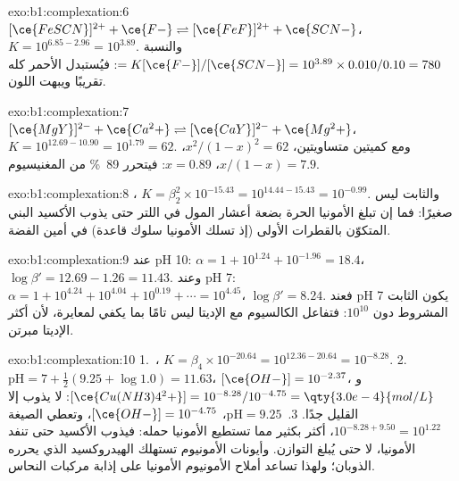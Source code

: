\begin{solution}{exo:b1:complexation:6}
$[\ce{FeSCN}]^{2+} + \ce{F-} \rightleftharpoons [\ce{FeF}]^{2+} + \ce{SCN-}$،
$K = 10^{6.85 - 2.96} = 10^{3.89}$. والنسبة $= K[\ce{F-}]/[\ce{SCN-}] =
10^{3.89} \times 0.010/0.10 = 780$: فيُستبدل  الأحمر كله تقريبًا
ويبهت اللون.
\end{solution}

\begin{solution}{exo:b1:complexation:7}
$[\ce{MgY}]^{2-} + \ce{Ca^2+} \rightleftharpoons [\ce{CaY}]^{2-} + \ce{Mg^2+}$،
$K = 10^{12.69 - 10.90} = 10^{1.79} = 62$. ومع كميتين متساويتين،
$x^2/(1 - x)^2 = 62$، $x/(1 - x) = 7.9$، $x = 0.89$: فيتحرر \qty{89}{\percent} من
المغنيسيوم.
\end{solution}

\begin{solution}{exo:b1:complexation:8}
، $K = \beta_2^2 \times
10^{-15.43} = 10^{14.44 - 15.43} = 10^{-0.99}$. والثابت ليس
صغيرًا: فما إن تبلغ الأمونيا الحرة بضعة أعشار المول في
اللتر حتى يذوب الأكسيد البني المتكوّن بالقطرات الأولى (إذ تسلك الأمونيا
سلوك قاعدة) في أمين الفضة.
\end{solution}

\begin{solution}{exo:b1:complexation:9}
عند pH 10: $\alpha = 1 + 10^{1.24} + 10^{-1.96} = 18.4$، $\log\beta' = 12.69 -
1.26 = 11.43$. وعند pH 7: $\alpha = 1 + 10^{4.24} + 10^{4.04} + 10^{0.19} +
\cdots = 10^{4.45}$، $\log\beta' = 8.24$. فعند pH 7 يكون الثابت المشروط
دون $10^{10}$: فتفاعل الكالسيوم مع الإديتا ليس تامًا
بما يكفي لمعايرة، لأن أكثر الإديتا مبرتن.
\end{solution}

\begin{solution}{exo:b1:complexation:10}
1.~، $K = \beta_4 \times
10^{-20.64} = 10^{12.36 - 20.64} = 10^{-8.28}$.
2.~$\mathrm{pH} = 7 + \frac12(9.25 + \log 1.0) = 11.63$، $[\ce{OH-}] =
10^{-2.37}$، و$[\ce{Cu(NH3)4^2+}] = 10^{-8.28}/10^{-4.75} =
\qty{3.0e-4}{mol/L}$: لا يذوب إلا القليل جدًا.
3.~$\mathrm{pH} = 9.25$، $[\ce{OH-}] = 10^{-4.75}$، وتعطي الصيغة
$10^{-8.28 + 9.50} = 10^{1.22}$، أكثر بكثير مما تستطيع الأمونيا حمله: فيذوب
الأكسيد حتى تنفد الأمونيا، لا حتى يُبلغ التوازن. وأيونات
الأمونيوم تستهلك الهيدروكسيد الذي يحرره الذوبان؛ ولهذا
تساعد أملاح الأمونيوم الأمونيا على إذابة مركبات النحاس.
\end{solution}

